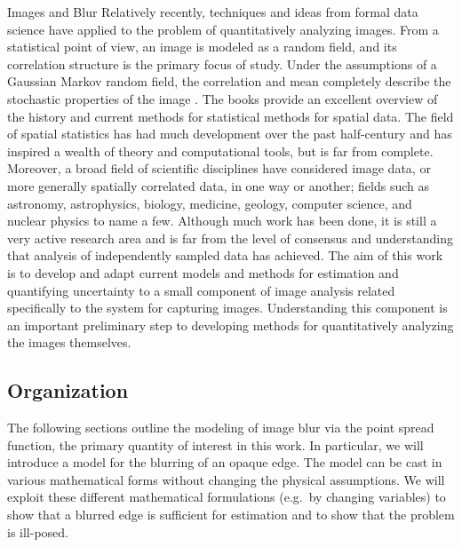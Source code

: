 \begin{chapter}{Images and Blur}
Relatively recently, techniques and ideas from formal data science have applied to the problem of quantitatively analyzing images.
From a statistical point of view, an image is modeled as a random field, and its correlation structure is the primary focus of study.
Under the assumptions of a Gaussian Markov random field, the correlation and mean completely describe the stochastic properties of the image \citep{rue2005gaussian}.
The books \citep{cressie1993statistics,rue2005gaussian} provide an excellent overview of the history and current methods for statistical methods for spatial data.
The field of spatial statistics has had much development over the past half-century and has inspired a wealth of theory and computational tools, but is far from complete.
Moreover, a broad field of scientific disciplines have considered image data, or more generally spatially correlated data, in one way or another; fields such as astronomy, astrophysics, biology, medicine, geology, computer science, and nuclear physics to name a few.
Although much work has been done, it is still a very active research area and is far from the level of consensus and understanding that analysis of independently sampled data has achieved. 
The aim of this work is to develop and adapt current models and methods for estimation and quantifying uncertainty to a small component of image analysis related specifically to the system for capturing images.
Understanding this component is an important preliminary step to developing methods for quantitatively analyzing the images themselves.

\subsection{Organization}
  The following sections outline the modeling of image blur via the point spread function, the primary quantity of interest in this work.
  In particular, we will introduce a model for the blurring of an opaque edge. 
  The model can be cast in various mathematical forms without changing the physical assumptions.
  We will exploit these different mathematical formulations (e.g.~by changing variables) to show that a blurred edge is sufficient for estimation and to show that the problem is ill-posed.



\end{chapter}
